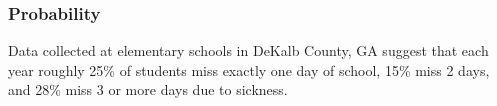 \documentclass[12pt,answers]{exam}
\newcounter{countA}
\begin{document}
\subsubsection*{Probability}\label{probability}
\begin{questions}
\setcounter{question}{\value{countA}}
%
%
\question
  Data collected at elementary schools in DeKalb County, GA suggest that
  each year roughly 25\% of students miss exactly one day of school,
  15\% miss 2 days, and 28\% miss 3 or more days due to sickness.


\end{questions}
\end{document}
